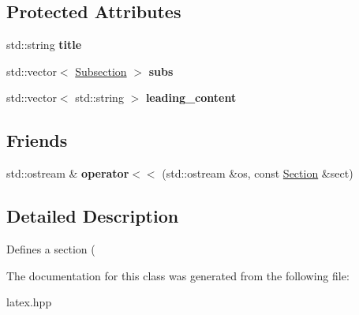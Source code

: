 \subsection*{Protected Attributes}
\begin{DoxyCompactItemize}
\item 
\hypertarget{classlatex_1_1doc_1_1Section_af6e7088b15a34c0faf4f60fd97f8a8d6}{std\-::string {\bfseries title}}\label{classlatex_1_1doc_1_1Section_af6e7088b15a34c0faf4f60fd97f8a8d6}

\item 
\hypertarget{classlatex_1_1doc_1_1Section_a0a8b071155892bf86e5e60243b58666b}{std\-::vector$<$ \hyperlink{classlatex_1_1doc_1_1Subsection}{Subsection} $>$ {\bfseries subs}}\label{classlatex_1_1doc_1_1Section_a0a8b071155892bf86e5e60243b58666b}

\item 
\hypertarget{classlatex_1_1doc_1_1Section_a91474f637298d07905279379ff8a36e1}{std\-::vector$<$ std\-::string $>$ {\bfseries leading\-\_\-content}}\label{classlatex_1_1doc_1_1Section_a91474f637298d07905279379ff8a36e1}

\end{DoxyCompactItemize}
\subsection*{Friends}
\begin{DoxyCompactItemize}
\item 
\hypertarget{classlatex_1_1doc_1_1Section_a8326770a980114dff62ba317662cb7a9}{std\-::ostream \& {\bfseries operator$<$$<$} (std\-::ostream \&os, const \hyperlink{classlatex_1_1doc_1_1Section}{Section} \&sect)}\label{classlatex_1_1doc_1_1Section_a8326770a980114dff62ba317662cb7a9}

\end{DoxyCompactItemize}


\subsection{Detailed Description}
Defines a section (

The documentation for this class was generated from the following file\-:\begin{DoxyCompactItemize}
\item 
latex.\-hpp\end{DoxyCompactItemize}

